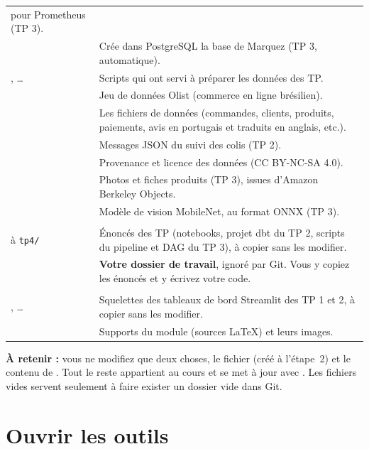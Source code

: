 {\begin{xltabular}{\textwidth}{@{}>{\raggedright\arraybackslash}p{5.6cm} >{\raggedright\arraybackslash}X@{}}
  pour Prometheus (TP 3). \\
 & Crée dans PostgreSQL la base de Marquez (TP 3, automatique). \\
, \dots & Scripts qui ont servi à préparer les données des TP. \\
\addlinespace
{} & Jeu de données Olist (commerce en ligne brésilien). \\*
 & Les fichiers de données (commandes, clients, produits, paiements, avis en
  portugais et traduits en anglais, etc.). \\
 & Messages JSON du suivi des colis (TP 2). \\
 & Provenance et licence des données (CC BY-NC-SA 4.0). \\
\addlinespace
{} & Photos et fiches produits (TP 3), issues d'Amazon Berkeley Objects. \\
 & Modèle de vision MobileNet, au format ONNX (TP 3). \\
\addlinespace
{} & \\*
 à \texttt{tp4/} & Énoncés des TP (notebooks, projet dbt du TP 2, scripts
  du pipeline et DAG du TP 3), à copier sans les modifier. \\
 & \textbf{Votre dossier de travail}, ignoré par Git. Vous y copiez
  les énoncés et y écrivez votre code. \\
\addlinespace
{} & \\*
, \dots & Squelettes des tableaux de bord Streamlit des TP 1 et 2, à copier sans les modifier. \\
\addlinespace
{} & Supports du module (sources \LaTeX{}) et leurs images. \\*
\end{xltabular}
}

\textbf{À retenir :} vous ne modifiez que deux choses, le fichier  (créé à l'étape~2)
et le contenu de . Tout le reste appartient au cours et se met à jour
avec . Les fichiers vides  servent seulement à faire exister un dossier
vide dans Git.

\section{Ouvrir les outils}

